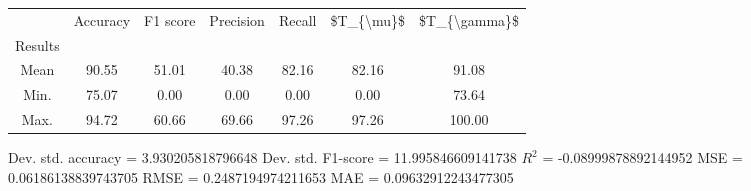 \begin{tabular}{|c|c|c|c|c|c|c|}
\toprule
{} &  Accuracy &  F1 score &  Precision &  Recall &  \$T\_\{\textbackslash mu\}\$ &  \$T\_\{\textbackslash gamma\}\$ \\
Results &           &           &            &         &            &               \\
\hline
Mean    &     90.55 &     51.01 &      40.38 &   82.16 &      82.16 &         91.08 \\
Min.    &     75.07 &      0.00 &       0.00 &    0.00 &       0.00 &         73.64 \\
Max.    &     94.72 &     60.66 &      69.66 &   97.26 &      97.26 &        100.00 \\
\bottomrule
\end{tabular}

 Dev. std. accuracy = 3.930205818796648
 Dev. std. F1-score = 11.995846609141738
 $R^2$ = -0.08999878892144952
 MSE = 0.06186138839743705
 RMSE = 0.2487194974211653
 MAE = 0.09632912243477305